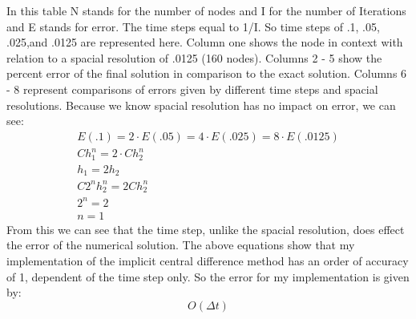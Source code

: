 \documentclass[12pt]{article}
\begin{document}
In this table N stands for the number of nodes and I for the number of Iterations and E stands for error. The time steps equal to 1/I. So time steps of .1, .05, .025,and .0125 are represented here. Column one shows the node in context with relation to a spacial resolution of .0125 (160 nodes). Columns 2 - 5 show the percent error of the final solution in comparison to the exact solution. Columns 6 - 8 represent comparisons of errors given by different time steps and spacial resolutions. Because we know spacial resolution has no impact on error, we can see:
\begin{equation}
\begin{aligned}
  E(.1) = 2 \cdot E(.05) = 4 \cdot E(.025) = 8 \cdot E(.0125) \\
  Ch_1^n = 2 \cdot C h_2^n \\
  h_1 = 2h_2 \\
  C2^nh_2^n = 2Ch_2^n \\
  2^n = 2 \\
  n = 1
\end{aligned}
\end{equation}
From this we can see that the time step, unlike the spacial resolution, does effect the error of the numerical solution. The above equations show that my implementation of the implicit central difference method has an order of accuracy of 1, dependent of the time step only. So the error for my implementation is given by:
\begin{equation}
O(\Delta t)
\end{equation}

\clearpage
\appendix
\end{document}
